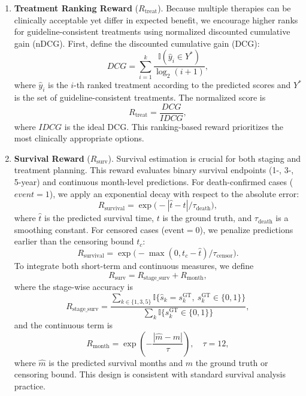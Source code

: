\documentclass{article}
\begin{document}
\begin{enumerate}
    \item \textbf{Treatment Ranking Reward} ($R_{\text{treat}}$).  
    Because multiple therapies can be clinically acceptable yet differ in expected benefit, we encourage higher ranks for guideline-consistent treatments using normalized discounted cumulative gain (nDCG). 
    First, define the discounted cumulative gain (DCG):
    \begin{equation}
    DCG = \sum_{i=1}^k \frac{\mathbb{I}(\hat{y}_i \in Y^*)}{\log_2(i+1)},
    \end{equation}
    where $\hat{y}_i$ is the $i$-th ranked treatment according to the predicted scores and $Y^*$ is the set of guideline-consistent treatments. 
    The normalized score is
    \begin{equation}
    R_{\text{treat}} = \frac{DCG}{IDCG},
    \end{equation}
    where $IDCG$ is the ideal DCG. 
    This ranking-based reward prioritizes the most clinically appropriate options.

    \item \textbf{Survival Reward} ($R_{\text{surv}}$).  
    Survival estimation is crucial for both staging and treatment planning. 
    This reward evaluates binary survival endpoints (1-, 3-, 5-year) and continuous month-level predictions. 
    For death-confirmed cases ($event=1$), we apply an exponential decay with respect to the absolute error:
    \[
    R_{\text{survival}} = \exp\big(-| \hat{t} - t | / \tau_{\text{death}} \big),
    \]
    where $\hat{t}$ is the predicted survival time, $t$ is the ground truth, and $\tau_{\text{death}}$ is a smoothing constant. 
    For censored cases ($\text{event}=0$), we penalize predictions earlier than the censoring bound $t_c$:
    \[
    R_{\text{survival}} = \exp\big(-\max(0, t_c - \hat{t}) / \tau_{\text{censor}} \big).
    \]
    To integrate both short-term and continuous measures, we define
    \begin{equation}
        R_{\text{surv}} = R_{\text{stage\_surv}} + R_{\text{month}},
    \end{equation}
    where the stage-wise accuracy is
    \begin{equation}
        R_{\text{stage\_surv}} = \frac{\sum_{k \in \{1,3,5\}} \mathbb{I}\{\hat{s}_k = s_k^{\text{GT}}, \ s_k^{\text{GT}} \in \{0,1\}\}}{\sum_k \mathbb{I}\{s_k^{\text{GT}} \in \{0,1\}\}},
    \end{equation}
    and the continuous term is
    \begin{equation}
        R_{\text{month}} = \exp\left(-\frac{|\hat{m} - m|}{\tau}\right), \quad \tau = 12,
    \end{equation}
    where $\hat{m}$ is the predicted survival months and $m$ the ground truth or censoring bound. 
    This design is consistent with standard survival analysis practice.


\end{enumerate}
\end{document}
